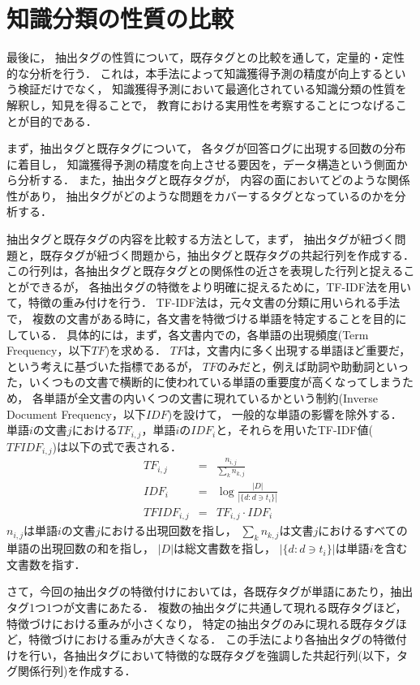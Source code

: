 \section{知識分類の性質の比較}
最後に，
抽出タグの性質について，既存タグとの比較を通して，定量的・定性的な分析を行う．
これは，本手法によって知識獲得予測の精度が向上するという検証だけでなく，
知識獲得予測において最適化されている知識分類の性質を解釈し，知見を得ることで，
教育における実用性を考察することにつなげることが目的である．

まず，抽出タグと既存タグについて，
各タグが回答ログに出現する回数の分布に着目し，
知識獲得予測の精度を向上させる要因を，データ構造という側面から分析する．
また，抽出タグと既存タグが，
内容の面においてどのような関係性があり，
抽出タグがどのような問題をカバーするタグとなっているのかを分析する．

抽出タグと既存タグの内容を比較する方法として，まず，
抽出タグが紐づく問題と，既存タグが紐づく問題から，抽出タグと既存タグの共起行列を作成する．
この行列は，各抽出タグと既存タグとの関係性の近さを表現した行列と捉えることができるが，
各抽出タグの特徴をより明確に捉えるために，TF-IDF法を用いて，特徴の重み付けを行う．
TF-IDF法は，元々文書の分類に用いられる手法で，
複数の文書がある時に，各文書を特徴づける単語を特定することを目的にしている．
具体的には，まず，各文書内での，各単語の出現頻度(Term Frequency，以下$TF$)を求める．
$TF$は，文書内に多く出現する単語ほど重要だ，という考えに基づいた指標であるが，
$TF$のみだと，例えば助詞や助動詞といった，いくつもの文書で横断的に使われている単語の重要度が高くなってしまうため，
各単語が全文書の内いくつの文書に現れているかという制約(Inverse Document Frequency，以下$IDF$)を設けて，
一般的な単語の影響を除外する．
単語$i$の文書$j$における$TF_{i,j}$，単語$i$の$IDF_i$と，それらを用いたTF-IDF値($TFIDF_{i,j}$)は以下の式で表される．
\begin{eqnarray}
TF_{i,j} &=& \frac {n_{i,j}}{\sum _{k}n_{k,j}}
\\
IDF_i &=& \log {\frac {|D|}{|\{d:d\ni t_{i}\}|}}
\\
TFIDF_{i,j} &=& TF_{i,j} \cdot IDF_i
\end{eqnarray}
$n_{i,j}$は単語$i$の文書$j$における出現回数を指し，
$\sum _{k}n_{k,j}$は文書$j$におけるすべての単語の出現回数の和を指し，
$|D|$は総文書数を指し，
$|\{d:d\ni t_{i}\}|$は単語$i$を含む文書数を指す．


さて，今回の抽出タグの特徴付けにおいては，各既存タグが単語にあたり，抽出タグ1つ1つが文書にあたる．
複数の抽出タグに共通して現れる既存タグほど，特徴づけにおける重みが小さくなり，
特定の抽出タグのみに現れる既存タグほど，特徴づけにおける重みが大きくなる．
この手法により各抽出タグの特徴付けを行い，各抽出タグにおいて特徴的な既存タグを強調した共起行列(以下，タグ関係行列)を作成する．

